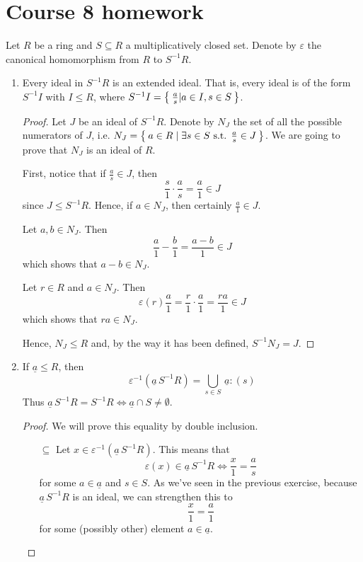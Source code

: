 \section*{Course 8 homework}

\begin{exercise}
Let \(R\) be a ring and \(S \subseteq R\) a multiplicatively closed set. Denote by \(\varepsilon\) the canonical homomorphism from \(R\) to \(S^{-1} R\).

\begin{enumerate}
    \item Every ideal in \(S^{-1} R\) is an extended ideal. That is, every ideal is of the form \(S^{-1} I\) with \(I \leq R\), where \(S^{-1} I = \Set{ \frac{a}{s} \vert a \in I, s \in S }\).
    
    \begin{proof}
    Let \(J\) be an ideal of \(S^{-1} R\). Denote by \(N_J\) the set of all the possible numerators of \(J\), i.e. \(N_J = \Set{ a \in R \mid \exists s \in S \text{ s.t. } \frac{a}{s} \in J}\). We are going to prove that \(N_J\) is an ideal of \(R\).
    
    First, notice that if \(\frac{a}{s} \in J\), then
    \[
        \frac{s}{1} \cdot \frac{a}{s} = \frac{a}{1} \in J
    \]
    since \(J \leq S^{-1} R\). Hence, if \(a \in N_J\), then certainly \(\frac{a}{1} \in J\).
    
    Let \(a, b \in N_J\). Then
    \[
        \frac{a}{1} - \frac{b}{1} = \frac{a - b}{1} \in J
    \]
    which shows that \(a - b \in N_J\).
    
    Let \(r \in R\) and \(a \in N_J\). Then
    \[
        \varepsilon(r) \frac{a}{1} = \frac{r}{1} \cdot \frac{a}{1} = \frac{ra}{1} \in J
    \]
    which shows that \(ra \in N_J\).
    
    Hence, \(N_J \leq R\) and, by the way it has been defined, \(S^{-1} N_J = J\).
    \end{proof}
    
    \item If \(\underline{a} \leq R\), then
    \[
        \varepsilon^{-1} (\underline{a} \, S^{-1} R) = \bigcup_{s \in S} \, \underline{a} : (s)
    \]
    Thus \(\underline{a} \, S^{-1} R = S^{-1} R \iff \underline{a} \cap S \neq \emptyset\).
    
    \begin{proof}
    We will prove this equality by double inclusion.
    
    \begin{itemize}
        \item[\(\subseteq\)] Let \(x \in \varepsilon^{-1} (\underline{a} \, S^{-1} R)\).
        This means that
        \[
            \varepsilon(x) \in \underline{a} \, S^{-1} R \iff
            \frac{x}{1} = \frac{a}{s}
        \]
        for some \(a \in \underline{a}\) and \(s \in S\). As we've seen in the previous exercise, because \(\underline{a} \, S^{-1} R\) is an ideal, we can strengthen this to
        \[
            \frac{x}{1} = \frac{a}{1}
        \]
        for some (possibly other) element \(a \in \underline{a}\).
        

\end{itemize}
\end{proof}
\end{enumerate}
\end{exercise}
